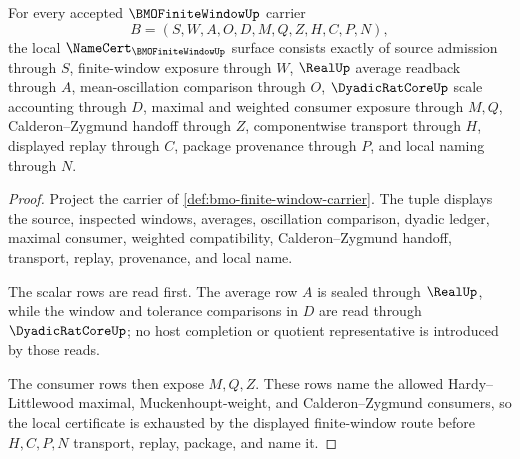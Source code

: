 \begin{theorem}
\label{thm:bmo-finite-window-namecert-obligations}
For every accepted $\BMOFiniteWindowUp$ carrier
$$
B=(S,W,A,O,D,M,Q,Z,H,C,P,N),
$$
the local $\NameCert_{\BMOFiniteWindowUp}$ surface consists exactly of source admission through $S$, finite-window exposure through $W$, $\RealUp$ average readback through $A$, mean-oscillation comparison through $O$, $\DyadicRatCoreUp$ scale accounting through $D$, maximal and weighted consumer exposure through $M,Q$, Calderon--Zygmund handoff through $Z$, componentwise transport through $H$, displayed replay through $C$, package provenance through $P$, and local naming through $N$.
\end{theorem}
\begin{proof}
Project the carrier of \autoref{def:bmo-finite-window-carrier}. The tuple displays the source, inspected windows, averages, oscillation comparison, dyadic ledger, maximal consumer, weighted compatibility, Calderon--Zygmund handoff, transport, replay, provenance, and local name.

The scalar rows are read first. The average row $A$ is sealed through $\RealUp$, while the window and tolerance comparisons in $D$ are read through $\DyadicRatCoreUp$; no host completion or quotient representative is introduced by those reads.

The consumer rows then expose $M,Q,Z$. These rows name the allowed Hardy--Littlewood maximal, Muckenhoupt-weight, and Calderon--Zygmund consumers, so the local certificate is exhausted by the displayed finite-window route before $H,C,P,N$ transport, replay, package, and name it.
\end{proof}

